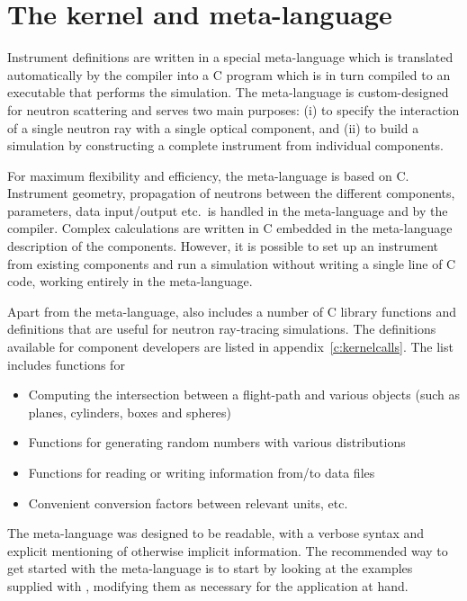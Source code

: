 
\chapter{The \MCS kernel and meta-language}
\label{c:kernel}

Instrument definitions are written in a special \MCS meta-language which
is translated automatically by the \MCS compiler into a C program
which is in turn compiled to an executable that
performs the simulation. The meta-language is custom-designed for neutron
scattering and serves two main purposes: (i) to specify the interaction of a
single neutron ray with a single optical component, and (ii) to build a
simulation by constructing a complete instrument from individual
components.

For maximum flexibility and efficiency, the meta-language is based on C.
Instrument geometry, propagation of neutrons between the different
components, parameters, data input/output etc.\ is handled in the
meta-language and by the \MCS compiler. Complex calculations are written in
C embedded in the meta-language description of the
components. However, it is
possible to set up an instrument from existing components and
run a simulation without writing a single line of C code, working
entirely in the meta-language.

Apart from the meta-language, \MCS also includes a number of C library
functions and definitions that are useful for neutron ray-tracing
simulations. The definitions available for component developers are
listed in appendix~\ref{c:kernelcalls}. The list includes functions
for
\begin{itemize}
\item Computing the intersection between a flight-path and various
  objects (such as planes, cylinders, boxes and spheres)
\item Functions for generating random numbers
with various distributions
\item Functions for reading or writing information from/to data
  files
\item Convenient conversion factors between relevant units, etc.
\end{itemize}

The \MCS meta-language was designed to be readable, with a verbose
syntax and explicit mentioning of otherwise implicit information. The
recommended way to get started with the meta-language is to start by
looking at the examples supplied with \MCS, modifying them as necessary
for the application at hand.

